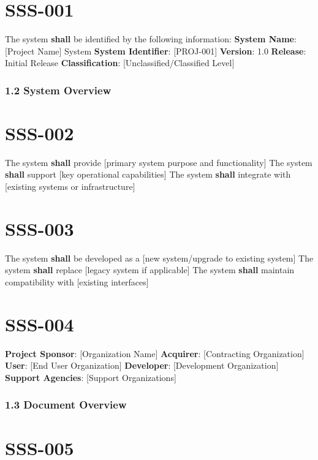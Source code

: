 \section{SSS-001}\label{SSS-001}

The system \textbf{shall} be identified by the following information:
\textbf{System Name}: [Project Name] System
\textbf{System Identifier}: [PROJ-001]
\textbf{Version}: 1.0
\textbf{Release}: Initial Release
\textbf{Classification}: [Unclassified/Classified Level]

\subsubsection{1.2 System Overview}

\section{SSS-002}\label{SSS-002}

The system \textbf{shall} provide [primary system purpose and functionality]
The system \textbf{shall} support [key operational capabilities]
The system \textbf{shall} integrate with [existing systems or infrastructure]

\section{SSS-003}\label{SSS-003}

The system \textbf{shall} be developed as a [new system/upgrade to existing system]
The system \textbf{shall} replace [legacy system if applicable]
The system \textbf{shall} maintain compatibility with [existing interfaces]

\section{SSS-004}\label{SSS-004}

\textbf{Project Sponsor}: [Organization Name]
\textbf{Acquirer}: [Contracting Organization]
\textbf{User}: [End User Organization]
\textbf{Developer}: [Development Organization]
\textbf{Support Agencies}: [Support Organizations]

\subsubsection{1.3 Document Overview}

\section{SSS-005}\label{SSS-005}

